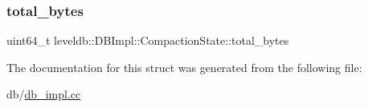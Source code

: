 \mbox{\label{structleveldb_1_1_d_b_impl_1_1_compaction_state_a21aa7304978dffc6841c4c11761f4b71}} 
\subsubsection{\texorpdfstring{total\_bytes}{total\_bytes}}
{\footnotesize\ttfamily uint64\+\_\+t leveldb\+::\+D\+B\+Impl\+::\+Compaction\+State\+::total\+\_\+bytes}



The documentation for this struct was generated from the following file\+:\begin{DoxyCompactItemize}
\item 
db/\mbox{\hyperlink{db__impl_8cc}{db\+\_\+impl.\+cc}}\end{DoxyCompactItemize}
